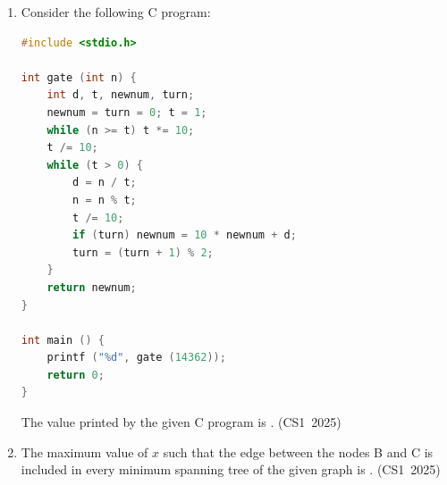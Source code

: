 \begin{enumerate}[label=\thesubsection.\arabic*, ref=\thesubsection.\theenumi]
\begin{center}
\end{center}

Consider the following C program segment that modifies the list L1. The number of nodes that will be there in L1 after the execution of the code segment is \underline{\hspace{1cm}}.
\hfill (CS1~2025)
\begin{lstlisting}[language=C]
int find (int query, LIST *list) {
    while (list != NULL) {
        if (list->data == query) return 1;
        list = list->next;
    }
    return 0;
}

int main () {
    ptr1 = L1; ptr2 = L2;
    while (ptr1->next != NULL) {
        query = ptr1->next->data;
        if (find (query, L2))
            ptr1->next = ptr1->next->next;
        else
            ptr1 = ptr1->next;
    }
    return 0;
}
\end{lstlisting}

\item Consider the following C program:
\begin{lstlisting}[language=C]
#include <stdio.h>

int gate (int n) {
    int d, t, newnum, turn;
    newnum = turn = 0; t = 1;
    while (n >= t) t *= 10;
    t /= 10;
    while (t > 0) {
        d = n / t;
        n = n % t;
        t /= 10;
        if (turn) newnum = 10 * newnum + d;
        turn = (turn + 1) % 2;
    }
    return newnum;
}

int main () {
    printf ("%d", gate (14362));
    return 0;
}
\end{lstlisting}
The value printed by the given C program is \underline{\hspace{1cm}}.
\hfill (CS1~2025)

\item The maximum value of $x$ such that the edge between the nodes B and C is included in every minimum spanning tree of the given graph is \underline{\hspace{1cm}}.
\hfill (CS1~2025)


\end{enumerate}
